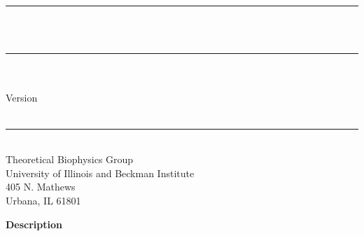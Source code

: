 
\thispagestyle{empty}

\vspace*{0.3in}

\begin{centering}
  \rule{6in}{0.04in}				\\	\vspace{0.25in}
  {\Huge \NAMD\ \DOCTITLE}			\\	\vspace{0.25in}
  \rule{6in}{0.04in}				\\	\vspace{0.25in}
  {\Large \NAMDAUTHORS}				\\	\vspace{0.20in}
  {\Large Version \NAMDVER}			\\	\vspace{0.20in}
  \NAMDDATE					\\	\vspace{0.20in}
  \rule{6in}{0.04in}				\\	\vspace{0.25in}
  {\large       Theoretical Biophysics Group                   \\
                University of Illinois and Beckman Institute   \\
                405 N. Mathews                                 \\
                Urbana, IL  61801}                             \\
\end{centering}
\vspace{0.2in}

\begin{center}
  {\Large \bf Description}
\end{center}

\noindent \DOCDESC

